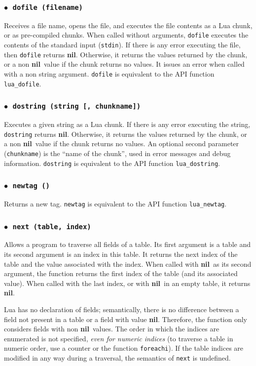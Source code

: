 \documentclass[11pt]{article}
\newcommand{\T}[1]{{\tt #1}}
\newcommand{\nil}{{\bf nil}}
\newcommand{\Deffunc}[1]{\index{#1}}
\newcommand{\ff}{$\bullet$\ }
\begin{document}
\subsubsection*{\ff \T{dofile (filename)}}\Deffunc{dofile}
Receives a file name,
opens the file, and executes the file contents as a Lua chunk,
or as pre-compiled chunks.
When called without arguments,
\verb|dofile| executes the contents of the standard input (\verb|stdin|).
If there is any error executing the file,
then \verb|dofile| returns \nil.
Otherwise, it returns the values returned by the chunk,
or a non \nil\ value if the chunk returns no values.
It issues an error when called with a non string argument.
\verb|dofile| is equivalent to the API function \verb|lua_dofile|.

\subsubsection*{\ff \T{dostring (string [, chunkname])}}\Deffunc{dostring}
Executes a given string as a Lua chunk.
If there is any error executing the string,
\verb|dostring| returns \nil.
Otherwise, it returns the values returned by the chunk,
or a non \nil\ value if the chunk returns no values.
An optional second parameter (\verb|chunkname|)
is the ``name of the chunk'',
used in error messages and debug information.
\verb|dostring| is equivalent to the API function \verb|lua_dostring|.

\subsubsection*{\ff \T{newtag ()}}\Deffunc{newtag}\label{pdf-newtag}
Returns a new tag.
\verb|newtag| is equivalent to the API function \verb|lua_newtag|.

\subsubsection*{\ff \T{next (table, index)}}\Deffunc{next}
Allows a program to traverse all fields of a table.
Its first argument is a table and its second argument
is an index in this table.
It returns the next index of the table and the
value associated with the index.
When called with \nil\ as its second argument,
the function returns the first index
of the table (and its associated value).
When called with the last index,
or with \nil\ in an empty table,
it returns \nil.

Lua has no declaration of fields;
semantically, there is no difference between a
field not present in a table or a field with value \nil.
Therefore, the function only considers fields with non \nil\ values.
The order in which the indices are enumerated is not specified,
\emph{even for numeric indices}
(to traverse a table in numeric order,
use a counter or the function \verb|foreachi|).
If the table indices are modified in any way during a traversal,
the semantics of \verb|next| is undefined.
\end{document}
